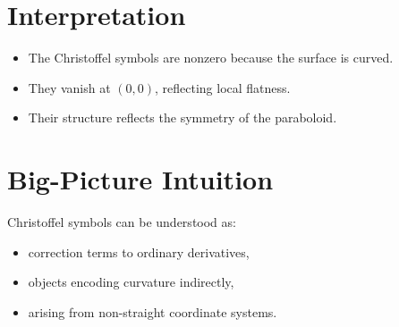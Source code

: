 \documentclass[a4paper,11pt]{article}
\begin{document}
	\section{Interpretation}
	
	\begin{itemize}
		\item The Christoffel symbols are nonzero because the surface is curved.
		\item They vanish at $(0,0)$, reflecting local flatness.
		\item Their structure reflects the symmetry of the paraboloid.
	\end{itemize}
	
	\section{Big-Picture Intuition}
	
	Christoffel symbols can be understood as:
	\begin{itemize}
		\item correction terms to ordinary derivatives,
		\item objects encoding curvature indirectly,
		\item arising from non-straight coordinate systems.
	\end{itemize}
	
\end{document}
